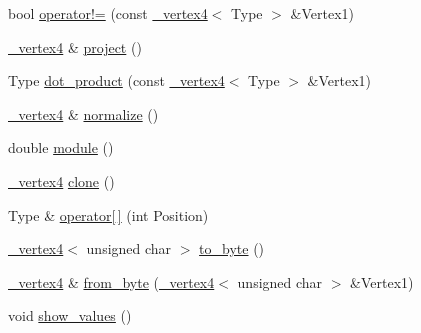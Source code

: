 \begin{DoxyCompactItemize}
\item 
bool \hyperlink{class__vertex4_a0ba4636056d99b8d72e0e1d9f41a0cb6}{operator!=} (const \hyperlink{class__vertex4}{\+\_\+vertex4}$<$ Type $>$ \&Vertex1)
\item 
\hyperlink{class__vertex4}{\+\_\+vertex4} \& \hyperlink{class__vertex4_a3c305186eec5f79b9af562896e79beda}{project} ()
\item 
Type \hyperlink{class__vertex4_ac954b06b01ae8d80b1f33b3a39944026}{dot\+\_\+product} (const \hyperlink{class__vertex4}{\+\_\+vertex4}$<$ Type $>$ \&Vertex1)
\item 
\hyperlink{class__vertex4}{\+\_\+vertex4} \& \hyperlink{class__vertex4_a09ebd88dc99cf80812716f427b104ae6}{normalize} ()
\item 
double \hyperlink{class__vertex4_a91b7559df998c865c54a99cb940d20f9}{module} ()
\item 
\hyperlink{class__vertex4}{\+\_\+vertex4} \hyperlink{class__vertex4_a98da9d52105e5f9660452c653c7b4341}{clone} ()
\item 
Type \& \hyperlink{class__vertex4_acd0acc184dbde695cc2b5505e6b5759e}{operator\mbox{[}$\,$\mbox{]}} (int Position)
\item 
\hyperlink{class__vertex4}{\+\_\+vertex4}$<$ unsigned char $>$ \hyperlink{class__vertex4_a1bfe45c6dd8eedb9699f036e32df3821}{to\+\_\+byte} ()
\item 
\hyperlink{class__vertex4}{\+\_\+vertex4} \& \hyperlink{class__vertex4_a58ed0504721288351f0fc19a23cf2fcc}{from\+\_\+byte} (\hyperlink{class__vertex4}{\+\_\+vertex4}$<$ unsigned char $>$ \&Vertex1)
\item 
void \hyperlink{class__vertex4_ae857f32ed0411c40962cedf68cf7d13e}{show\+\_\+values} ()
\end{DoxyCompactItemize}
